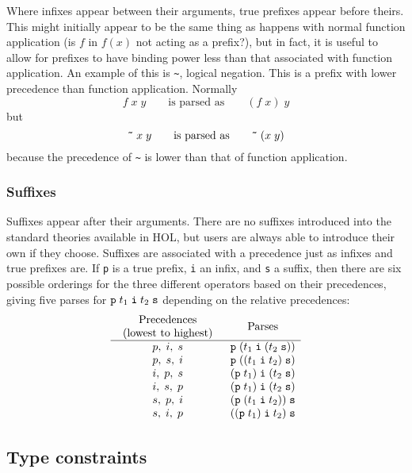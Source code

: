 \documentclass[12pt,fleqn,a4paper]{report}
\begin{document}
Where infixes appear between their arguments, true prefixes appear
before theirs.  This might initially appear to be the same thing as
happens with normal function application (is $f$ in $f(x)$ not acting
as a prefix?), but in fact, it is useful to allow for prefixes to have
binding power less than that associated with function application.  An
example of this is \verb+~+, logical negation.  This is a prefix with
lower precedence than function application.  Normally
\[
   f\;x\; y\qquad \mbox{is parsed as}\qquad (f\; x)\; y
\] but \[
  \mbox{\tt \~{}}\; x\; y\qquad\mbox{is parsed as}\qquad
  \mbox{\tt \~{}}\; (x\; y)
\] because the precedence of \verb+~+ is lower than that of function
  application.

\subsubsection{Suffixes}

Suffixes appear after their arguments.  There are no suffixes
introduced into the standard theories available in HOL, but users are
always able to introduce their own if they choose.  Suffixes are
associated with a precedence just as infixes and true prefixes are.
If \verb+p+ is a true prefix, \verb+i+ an infix, and \verb+s+ a
suffix, then there are six possible orderings for the three different
operators based on their precedences, giving five parses for
$\verb+p+\; t_1\; \verb+i+\; t_2\; \verb+s+$ depending on the relative
precedences:
\[
\begin{array}{cl}
\mbox{\begin{tabular}{c}Precedences\\(lowest to highest)\end{tabular}} &
\multicolumn{1}{c}{\mbox{Parses}}\\
\hline
p,\;i,\;s & \verb+p+\;(t_1\;\verb+i+\;(t_2\;\verb+s+))\\
p,\;s,\;i & \verb+p+\;((t_1\;\verb+i+\;t_2)\;\verb+s+)\\
i,\;p,\;s & (\verb+p+\;t_1)\;\verb+i+\;(t_2\;\verb+s+)\\
i,\;s,\;p & (\verb+p+\;t_1)\;\verb+i+\;(t_2\;\verb+s+)\\
s,\;p,\;i & (\verb+p+\;(t_1\;\verb+i+\;t_2))\;\verb+s+\\
s,\;i,\;p & ((\verb+p+\;t_1)\;\verb+i+\;t_2)\;\verb+s+\\
\end{array}
\]

\subsection{Type constraints}
\end{document}

